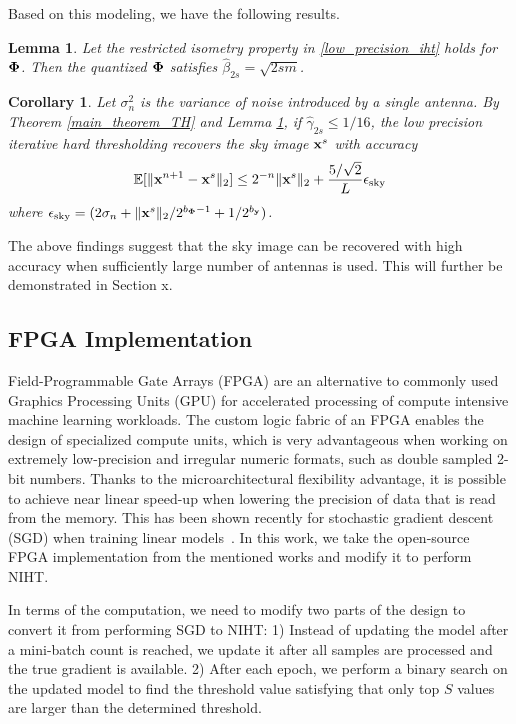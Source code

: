 \documentclass{article}
\newtheorem{lemma}{Lemma}
\newtheorem{corollary}{Corollary}
\begin{document}
Based on this modeling, we have the following results.
\begin{lemma}\label{beta_for_ra}
    Let the restricted isometry property in \ref{low_precision_iht} holds for ${\bf \Phi}$. Then the quantized ${\bf \Phi}$ satisfies $\hat{\beta}_{2s} = \sqrt{2sm}$.
\end{lemma}

\begin{corollary}
Let $\sigma_n^2$ is the variance of noise introduced by a single antenna. By Theorem \ref{main_theorem_TH} and Lemma \ref{beta_for_ra}, if $\hat{\gamma}_{2s}\leq 1/16$, the low precision iterative hard thresholding recovers the sky image ${\bf x}^s$ with accuracy
\begin{equation}
    \mathbb{E}[\|{\bf x}^{n+1} - {\bf x}^s \|_2] \leq 2^{-n}\| {\bf x}^s\|_2 + \frac{5/\sqrt{2}}{L} \epsilon_{\rm{sky}}
\end{equation}
where $\epsilon_{\rm{sky}} = (2\sigma_n + \|{\bf x}^s \|_2/2^{b_{\bf \Phi}-1} + 1/2^{b_{\bf y}})$.
\end{corollary}
The above findings suggest that the sky image can be recovered with high accuracy when sufficiently large number of antennas is used. This will further be demonstrated in Section x.


\subsection{FPGA Implementation}
Field-Programmable Gate Arrays (FPGA) are an alternative to commonly used Graphics Processing Units (GPU) for accelerated processing of compute intensive machine learning workloads. The custom logic fabric of an FPGA enables the design of specialized compute units, which is very advantageous when working on extremely low-precision and irregular numeric formats, such as double sampled 2-bit numbers. Thanks to the microarchitectural flexibility advantage, it is possible to achieve near linear speed-up when lowering the precision of data that is read from the memory. This has been shown recently for stochastic gradient descent (SGD) when training linear models~\cite{zhang2017zipml, kara2017fpga}. In this work, we take the open-source FPGA implementation from the mentioned works and modify it to perform NIHT.

In terms of the computation, we need to modify two parts of the design to convert it from performing SGD to NIHT: 1) Instead of updating the model after a mini-batch count is reached, we update it after all samples are processed and the true gradient is available. 2) After each epoch, we perform a binary search on the updated model to find the threshold value satisfying that only top $S$ values are larger than the determined threshold.
\end{document}
